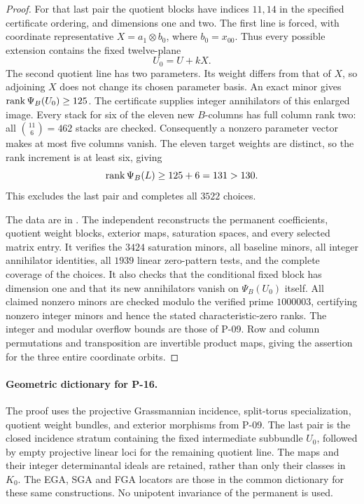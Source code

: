 \begin{proof}
For that last pair the quotient blocks have indices $11,14$ in the
specified certificate ordering, and dimensions one and two. The first
line is forced, with coordinate representative
$X=a_1\otimes b_0$, where $b_0=x_{00}$. Thus every possible extension
contains the fixed twelve-plane
\[
 U_0=U+kX.
\]
The second quotient line has two parameters. Its weight differs from
that of $X$, so adjoining $X$ does not change its chosen parameter basis.
An exact minor gives $\operatorname{rank}\Psi_B(U_0)\ge125$. The certificate supplies
integer annihilators of this enlarged image. Every stack for six of
the eleven new $B$-columns has full column rank two: all
$\binom{11}{6}=462$ stacks are checked. Consequently a nonzero parameter
vector makes at most five columns vanish. The eleven target weights
are distinct, so the rank increment is at least six, giving
\[
 \operatorname{rank}\Psi_B(L)\ge125+6=131>130.
\]
This excludes the last pair and completes all $3522$ choices.

The data are in . The independent
 reconstructs the permanent
coefficients, quotient weight blocks, exterior maps, saturation spaces,
and every selected matrix entry. It verifies the $3424$ saturation
minors, all baseline minors, all integer annihilator identities, all
$1939$ linear zero-pattern tests, and the complete coverage of the choices.
It also checks that the conditional fixed block has dimension one and
that its new annihilators vanish on $\Psi_B(U_0)$ itself. All claimed
nonzero minors are checked modulo the verified prime $1000003$,
certifying nonzero integer minors and hence the stated characteristic-zero
ranks. The integer and modular overflow bounds are those of P-09.
Row and column permutations and transposition are invertible product
maps, giving the assertion for the three entire coordinate orbits.
\end{proof}

\paragraph{Geometric dictionary for P-16.}
The proof uses the projective Grassmannian incidence, split-torus
specialization, quotient weight bundles, and exterior morphisms from
P-09. The last pair is the closed incidence stratum containing the
fixed intermediate subbundle $U_0$, followed by empty projective linear
loci for the remaining quotient line. The maps and their integer
determinantal ideals are retained, rather than only their classes in
$K_0$. The EGA, SGA and FGA locators are those in the common dictionary
for these same constructions. No unipotent invariance of the permanent
is used.
